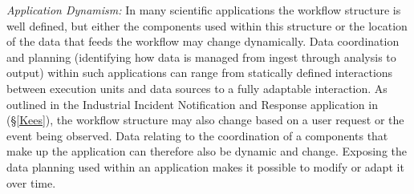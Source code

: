 

\emph{Application Dynamism: } In many scientific applications the
workflow structure is well defined, but either the components used
within this structure or the location of the data that feeds the
workflow may change dynamically.  Data coordination and planning
(identifying how data is managed from ingest through analysis to
output) within such applications can range from statically defined
interactions between execution units and data sources to a fully
adaptable interaction.  As outlined in the
Industrial Incident Notification and Response application in
(\S\ref{Kees}), the workflow structure may also change based on a user
request or the event being observed. Data relating to the coordination
of a components that make up the application can therefore also be
dynamic and change.  Exposing the data planning used within an
application makes it possible to modify or adapt it over time.






